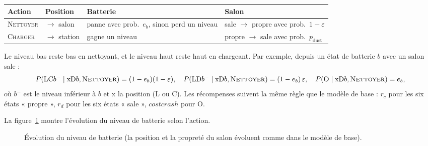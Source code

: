\documentclass[11pt,a4paper]{article}
\newcommand{\N}{\textsc{Nettoyer}}
\newcommand{\C}{\textsc{Charger}}
\newcommand{\pd}{p_{\text{dust}}}
\begin{document}
\begin{center}
\begin{tabular}{l l l l}
\toprule
Action & Position & Batterie & Salon \\
\midrule
\N & $\to$ salon & panne avec prob.\ $e_b$, sinon perd un niveau & sale $\to$ propre avec prob.\ $1-\varepsilon$ \\
\C & $\to$ station & gagne un niveau & propre $\to$ sale avec prob.\ $\pd$ \\
\bottomrule
\end{tabular}
\end{center}

Le niveau bas reste bas en nettoyant, et le niveau haut reste haut en chargeant.
Par exemple, depuis un état de batterie $b$ avec un salon sale :
\[
P(\text{LC}b^- \mid \text{xD}b, \N) = (1-e_b)(1-\varepsilon), \quad
P(\text{LD}b^- \mid \text{xD}b, \N) = (1-e_b)\,\varepsilon, \quad
P(\text{O} \mid \text{xD}b, \N) = e_b,
\]
où $b^-$ est le niveau inférieur à $b$ et x la position (L ou C). Les récompenses suivent la même règle que
le modèle de base : $r_c$ pour les six états « propre », $r_d$ pour les six états « sale », $\mathit{costcrash}$ pour O.

La figure~\ref{fig:batt} montre l'évolution du niveau de batterie selon l'action.

\begin{figure}[ht]
\centering
{}
\caption{Évolution du niveau de batterie (la position et la propreté du salon évoluent comme dans le modèle de base).}
\label{fig:batt}
\end{figure}
\end{document}
